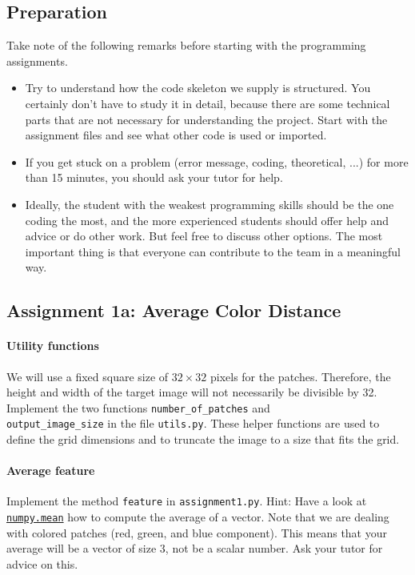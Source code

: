 \documentclass[a4paper]{article}
\begin{document}
	\subsection{Preparation}
		Take note of the following remarks before starting with the programming assignments.
		\begin{itemize}
			\item Try to understand how the code skeleton we supply is structured.
			You certainly don't have to study it in detail, because there are some technical parts that are not necessary for understanding the project.
			Start with the assignment files and see what other code is used or imported.
			
			\item If you get stuck on a problem (error message, coding, theoretical, ...) for more than 15 minutes, you should ask your tutor for help.
			
			\item Ideally, the student with the weakest programming skills should be the one coding the most, and the more experienced students should offer help and advice or do other work. 
			But feel free to discuss other options. 
			The most important thing is that everyone can contribute to the team in a meaningful way.
		\end{itemize}

	\subsection{Assignment 1a: Average Color Distance}
		\paragraph{Utility functions} 
		We will use a fixed square size of $32 \times 32$ pixels for the patches.
		Therefore, the height and width of the target image will not necessarily be divisible by 32.
		Implement the two functions \verb|number_of_patches| and \\ 
		\verb|output_image_size| in the file \verb|utils.py|.
		These helper functions are used to define the grid dimensions and to truncate the image to a size that fits the grid.
		
		\paragraph{Average feature}
		Implement the method \verb|feature| in \verb|assignment1.py|. 
		Hint: Have a look at 
		\href{https://docs.scipy.org/doc/numpy/reference/generated/numpy.mean.html}{\texttt{numpy.mean}} how to compute the average of a vector.
		Note that we are dealing with colored patches (red, green, and blue component). 
		This means that your average will be a vector of size 3, not be a scalar number.
		Ask your tutor for advice on this.
		
\end{document}

